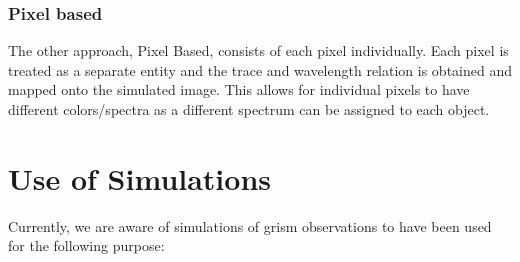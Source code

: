 \documentclass[preprint]{aastex}
\begin{document}
\subsubsection{Pixel based}

The other approach, Pixel Based, consists of each pixel individually. Each pixel is treated as a separate entity and the trace and wavelength relation is obtained and mapped onto the simulated image. This allows for individual pixels to have different colors/spectra as a different spectrum can be assigned to each object. 

\section{Use of Simulations}
Currently, we are aware of simulations of grism observations to have been used for the following purpose:
\end{document}
